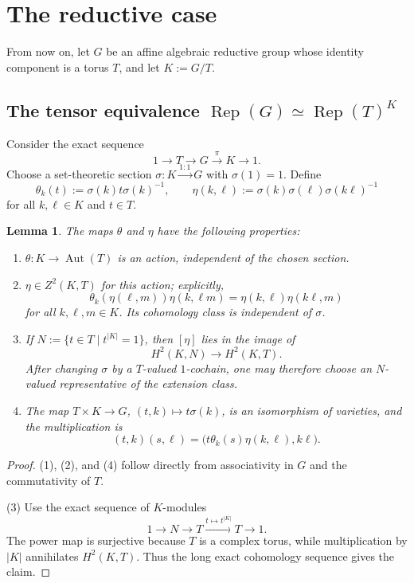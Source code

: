 \documentclass{amsart}
\newtheorem{lemma}[theorem]{Lemma}
\theoremstyle{definition}
\newcommand{\Aut}{\operatorname{Aut}}
\newcommand{\Rep}{\operatorname{Rep}}
\numberwithin{equation}{section}
\begin{document}
\section{The reductive case}\label{sec:reductive}

From now on, let $G$ be an affine algebraic reductive group whose identity
component is a torus $T$, and let $K:=G/T$.

\subsection{\texorpdfstring{The tensor equivalence $\Rep(G)\simeq\Rep(T)^K$}{The tensor equivalence for Rep(G)}}
\label{sec:tensor-equivalence}

Consider the exact sequence
\begin{equation}\label{eq:extension}
 1\rightarrow T\rightarrow G\xrightarrow{\pi}K\rightarrow 1.
\end{equation}
Choose a set-theoretic section $\sigma:K\xrightarrow{1:1} G$ with $\sigma(1)=1$.  Define
\[
 \theta_k(t):=\sigma(k)t\sigma(k)^{-1},
 \qquad
 \eta(k,\ell):=\sigma(k)\sigma(\ell)\sigma(k\ell)^{-1}
\]
for all $k,\ell\in K$ and $t\in T$.

\begin{lemma}\label{lem:extension-data}
The maps $\theta$ and $\eta$ have the following properties:
\begin{enumerate}
\item $\theta:K\to\Aut(T)$ is an action, independent of the chosen section.
\item $\eta\in Z^2(K,T)$ for this action; explicitly,
\[
 \theta_k(\eta(\ell,m))\eta(k,\ell m)
 =\eta(k,\ell)\eta(k\ell,m)
\]
for all $k,\ell,m\in K$. Its cohomology class is independent of $\sigma$.
\item 
If $N:=\{t\in T\mid t^{|K|}=1\}$, then $[\eta]$ lies in the image of
\[
 H^2(K,N)\longrightarrow H^2(K,T).
\]
After changing $\sigma$ by a $T$-valued $1$-cochain, one may therefore choose an
$N$-valued representative of the extension class.
\item 
The map $T\times K\to G$, $(t,k)\mapsto t\sigma(k)$, is an isomorphism of
varieties, and the multiplication is
\[
 (t,k)(s,\ell)=\bigl(t\theta_k(s)\eta(k,\ell),k\ell\bigr).
\]
\end{enumerate}
\end{lemma}

\begin{proof}
(1), (2), and (4) follow directly from associativity in $G$
and the commutativity of $T$.  

(3) Use the exact sequence of
$K$-modules
\[
 1\longrightarrow N\longrightarrow T
 \xrightarrow{t\mapsto t^{|K|}}T\longrightarrow1.
\]
The power map is surjective because $T$ is a complex torus, while multiplication by
$|K|$ annihilates $H^2(K,T)$.  Thus the long exact cohomology sequence gives the claim.
\end{proof}
\end{document}

